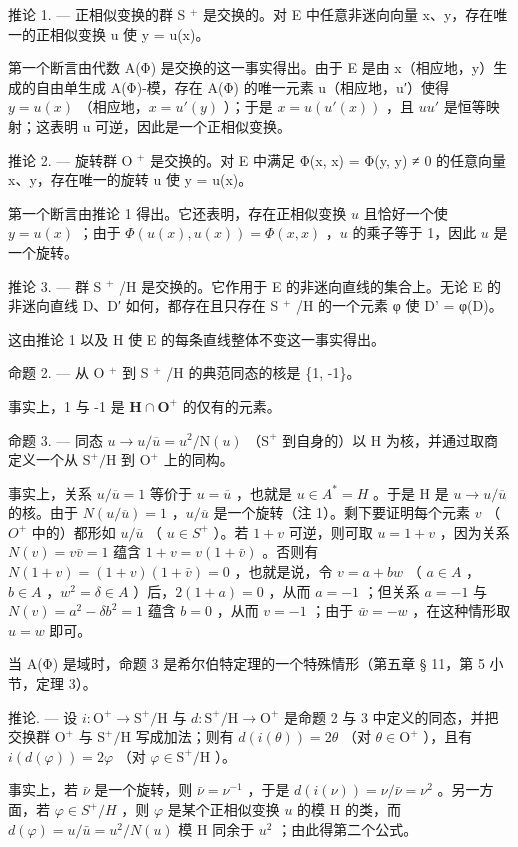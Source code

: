 推论 1. --- 正相似变换的群 S \(^{+}\) 是交换的。对 E 中任意非迷向向量 x、y，存在唯一的正相似变换 u 使 y = u(x)。

第一个断言由代数 A(Φ) 是交换的这一事实得出。由于 E 是由 x（相应地，y）生成的自由单生成 A(Φ)-模，存在 A(Φ) 的唯一元素 u（相应地，u′）使得 \(y = u(x)\) （相应地，\(x = u'(y)\) ）；于是 \(x = u(u'(x))\) ，且 \(uu'\) 是恒等映射；这表明 u 可逆，因此是一个正相似变换。

推论 2. --- 旋转群 O \(^{+}\) 是交换的。对 E 中满足 Φ(x, x) = Φ(y, y) ≠ 0 的任意向量 x、y，存在唯一的旋转 u 使 y = u(x)。

第一个断言由推论 1 得出。它还表明，存在正相似变换 \(u\) 且恰好一个使 \(y = u(x)\) ；由于 \(\Phi(u(x), u(x)) = \Phi(x, x)\) ，\(u\) 的乘子等于 1，因此 \(u\) 是一个旋转。

推论 3. --- 群 S \(^{+}\) /H 是交换的。它作用于 E 的非迷向直线的集合上。无论 E 的非迷向直线 D、D′ 如何，都存在且只存在 S \(^{+}\) /H 的一个元素 φ 使 D' = φ(D)。

这由推论 1 以及 H 使 E 的每条直线整体不变这一事实得出。

命题 2. --- 从 O \(^{+}\) 到 S \(^{+}\) /H 的典范同态的核是 \{1, -1\}。

事实上，1 与 -1 是 \(\mathbf{H} \cap \mathbf{O}^{+}\) 的仅有的元素。

命题 3. --- 同态 \(u \to u/\overline{u} = u^{2}/\mathrm{N}(u)\) （\(\mathrm{S}^{+}\) 到自身的）以 H 为核，并通过取商定义一个从 \(\mathrm{S}^{+}/\mathrm{H}\) 到 \(\mathrm{O}^{+}\) 上的同构。

事实上，关系 \(u/\overline{u} = 1\) 等价于 \(u = \overline{u}\) ，也就是 \(u \in A^* = H\) 。于是 H 是 \(u \to u/\overline{u}\) 的核。由于 \(N(u/\overline{u}) = 1\) ，\(u/\overline{u}\) 是一个旋转（注 1）。剩下要证明每个元素 \(v\) （\(O^+\) 中的）都形如 \(u/\overline{u}\) （ \(u \in S^+\) ）。若 \(1 + v\) 可逆，则可取 \(u = 1 + v\) ，因为关系 \(N(v) = v\bar{v} = 1\) 蕴含 \(1 + v = v(1 + \bar{v})\) 。否则有 \(N(1 + v) = (1 + v)(1 + \bar{v}) = 0\) ，也就是说，令 \(v = a + bw\) （ \(a \in A\) ，\(b \in A\) ，\(w^2 = \delta \in A\) ）后，\(2(1 + a) = 0\) ，从而 \(a = -1\) ；但关系 \(a = -1\) 与 \(N(v) = a^2 - \delta b^2 = 1\) 蕴含 \(b = 0\) ，从而 \(v = -1\) ；由于 \(\bar{w} = -w\) ，在这种情形取 \(u = w\) 即可。

当 A(Φ) 是域时，命题 3 是希尔伯特定理的一个特殊情形（第五章 § 11，第 5 小节，定理 3）。

推论. — 设 \(i: \mathrm{O}^{+} \to \mathrm{S}^{+}/\mathrm{H}\) 与 \(d: \mathrm{S}^{+}/\mathrm{H} \to \mathrm{O}^{+}\) 是命题 2 与 3 中定义的同态，并把交换群 \(\mathrm{O}^{+}\) 与 \(\mathrm{S}^{+}/\mathrm{H}\) 写成加法；则有 \(d(i(\theta)) = 2\theta\) （对 \(\theta \in \mathrm{O}^{+}\) ），且有 \(i(d(\varphi)) = 2\varphi\) （对 \(\varphi \in \mathrm{S}^{+}/\mathrm{H}\) ）。

事实上，若 \(\bar{\nu}\) 是一个旋转，则 \(\bar{\nu} = \nu^{-1}\) ，于是 \(d(i(\nu)) = \nu/\bar{\nu} = \nu^{2}\) 。另一方面，若 \(\varphi \in S^{+}/H\) ，则 \(\varphi\) 是某个正相似变换 \(u\) 的模 H 的类，而 \(d(\varphi) = u/\bar{u} = u^{2}/N(u)\) 模 H 同余于 \(u^{2}\) ；由此得第二个公式。

